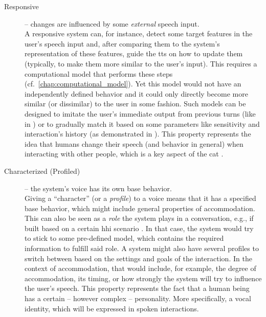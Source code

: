 \begin{description}
	\item[Responsive] -- changes are influenced by some \emph{external} speech input.\\
	A responsive system can, for instance, detect some target features in the user's speech input and, after comparing them to the system's representation of these features, guide the \ac{tts} on how to update them (typically, to make them more similar to the user's input).
	This requires a computational model that performs these steps (cf.\ \cref{chap:computational_model}).
	Yet this model would not have an independently defined behavior and it could only directly become more similar (or dissimilar) to the user in some fashion.
	Such models can be designed to imitate the user's immediate output from previous turns (like in \citet{Levitan2016implementing}) or to gradually match it based on some parameters like sensitivity and interaction's history (as demonstrated in \citet{Raveh2017Interspeech}).
	This property represents the idea that humans change their speech (and behavior in general) when interacting with other people, which is a key aspect of the \ac{cat} \citep[][and see \cref{sec:communication_accommodation_theory}]{Giles1991CAT}.
	
	\item[Characterized (Profiled)] -- the system's voice has its own base behavior.\\
	Giving a \enquote{character} (or a \emph{profile}) to a voice means that it has a specified base behavior, which might include general properties of accommodation.
	This can also be seen as a \emph{role} the system plays in a conversation, e.g., if built based on a certain \ac{hhi} scenario \citep{Silber-Varod2018prosodic}.
	In that case, the system would try to stick to some pre-defined model, which contains the required information to fulfill said role.
	A system might also have several profiles to switch between based on the settings and goals of the interaction.
	In the context of accommodation, that would include, for example, the degree of accommodation, its timing, or how strongly the system will try to influence the user's speech.
	This property represents the fact that a human being has a certain -- however complex -- personality.
	More specifically, a vocal identity, which will be expressed in spoken interactions.
	

\end{description}
